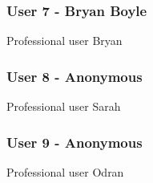 \newpage
\subsubsection{User 7 - Bryan Boyle}
Professional user Bryan

\newpage
\subsubsection{User 8 - Anonymous}
Professional user Sarah

\newpage
\subsubsection{User 9 - Anonymous}
Professional user Odran
